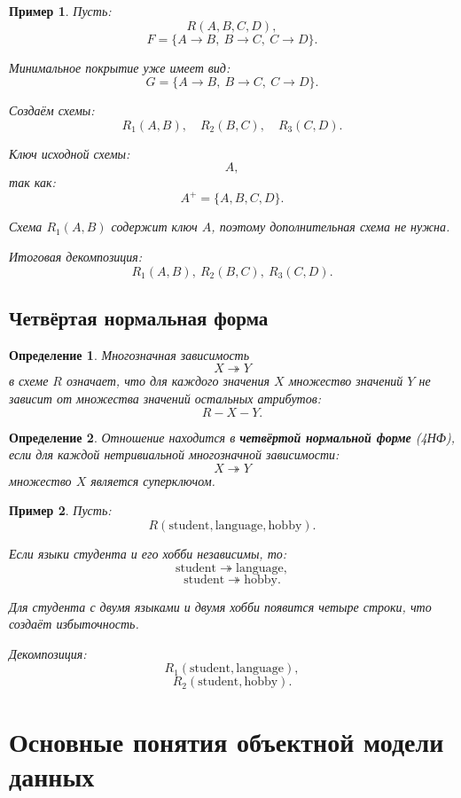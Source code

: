 \documentclass[12pt,a4paper]{article}
\newtheorem{definition}{Определение}[section]
\newtheorem{example}{Пример}[section]
\theoremstyle{remark}
\begin{document}
\begin{example}
Пусть:
\[
R(A,B,C,D),
\]
\[
F=\{A \to B,\ B \to C,\ C \to D\}.
\]

Минимальное покрытие уже имеет вид:
\[
G=\{A \to B,\ B \to C,\ C \to D\}.
\]

Создаём схемы:
\[
R_1(A,B),
\quad
R_2(B,C),
\quad
R_3(C,D).
\]

Ключ исходной схемы:
\[
A,
\]
так как:
\[
A^+ = \{A,B,C,D\}.
\]

Схема $R_1(A,B)$ содержит ключ $A$, поэтому дополнительная схема не нужна.

Итоговая декомпозиция:
\[
R_1(A,B),\ R_2(B,C),\ R_3(C,D).
\]
\end{example}

\subsection{Четвёртая нормальная форма}

\begin{definition}
Многозначная зависимость
\[
X \twoheadrightarrow Y
\]
в схеме $R$ означает, что для каждого значения $X$ множество значений $Y$ не зависит от множества значений остальных атрибутов:
\[
R - X - Y.
\]
\end{definition}

\begin{definition}
Отношение находится в \textbf{четвёртой нормальной форме} (4НФ), если для каждой нетривиальной многозначной зависимости:
\[
X \twoheadrightarrow Y
\]
множество $X$ является суперключом.
\end{definition}

\begin{example}
Пусть:
\[
R(\text{student}, \text{language}, \text{hobby}).
\]

Если языки студента и его хобби независимы, то:
\[
\text{student} \twoheadrightarrow \text{language},
\]
\[
\text{student} \twoheadrightarrow \text{hobby}.
\]

Для студента с двумя языками и двумя хобби появится четыре строки, что создаёт избыточность.

Декомпозиция:
\[
R_1(\text{student}, \text{language}),
\]
\[
R_2(\text{student}, \text{hobby}).
\]
\end{example}

\section{Основные понятия объектной модели данных}
\end{document}
